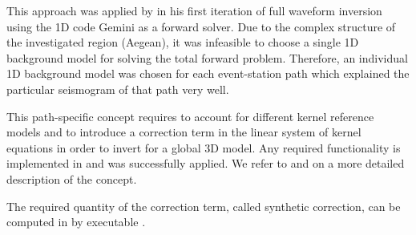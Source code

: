 This approach was applied by \cite{Lamara.2015b} in his first iteration of full waveform inversion
using the 1D code Gemini as a forward solver. Due to the complex structure of the investigated region
(Aegean), it was infeasible to choose a single 1D background model for solving the total forward problem. 
Therefore, an individual 1D background model was chosen for each event-station path which explained
the particular seismogram of that path very well. 

This path-specific concept requires to account for different kernel reference models and to introduce a
correction term in the linear system of kernel equations in order to invert for a global 3D model. Any 
required functionality is implemented in \ASKI{} and was successfully applied. We refer to \cite{Lamara.2015b}
and \cite{Schumacher16} on a more detailed description of the concept.

The required quantity of the correction term, called synthetic correction, can be computed in \ASKI{} by 
executable  .
